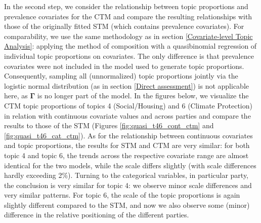 In the second step, we consider the relationship between topic proportions and prevalence covariates for the CTM and compare the resulting relationships with those of the originally fitted STM (which contains prevalence covariates). For comparability, we use the same methodology as in section \ref{Covariate-level Topic Analysis}: applying the method of composition with a quasibinomial regression of individual topic proportions on covariates. The only difference is that prevalence covariates were not included in the model used to generate topic proportions. Consequently, sampling all (unnormalized) topic proportions jointly via the logistic normal distribution (as in section \ref{Direct assessment}) is not applicable here, as $\boldsymbol{\Gamma}$ is no longer part of the model. In the figures below, we visualize the CTM topic proportions of topics 4 (Social/Housing) and 6 (Climate Protection) in relation with continuous covariate values and across parties and compare the results to those of the STM (Figures \ref{fig:quasi_t46_cont_ctm} and \ref{fig:quasi_t46_cat_ctm}). As for the relationship between continuous covariates and topic proportions, the results for STM and CTM are very similar: for both topic 4 and topic 6, the trends across the respective covariate range are almost identical for the two models, while the scale differs slightly (with scale differences hardly exceeding 2\%). Turning to the categorical variables, in particular party, the conclusion is very similar for topic 4: we observe minor scale differences and very similar patterns. For topic 6, the scale of the topic proportions is again slightly different compared to the STM, and now we also observe some (minor) difference in the relative positioning of the different parties. 

